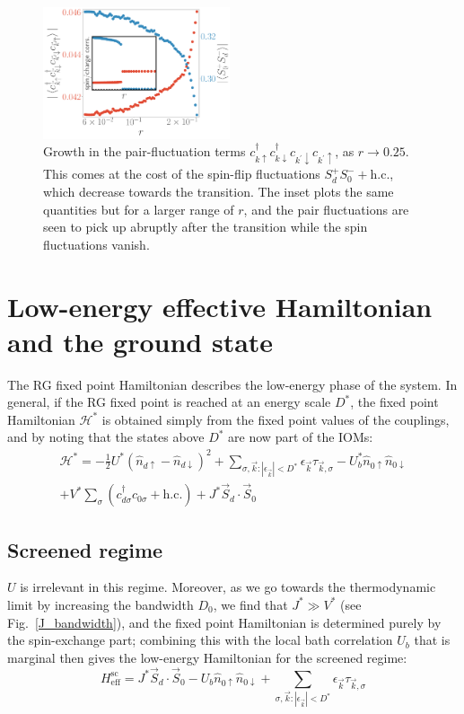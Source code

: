 \documentclass[reprint,superscriptaddress,floatfix]{revtex4-2}
\begin{document}
\begin{figure}[!htb]
	\centering
	\includegraphics[width=0.49\textwidth]{odlro.pdf}
	\caption{Growth in the pair-fluctuation terms \(c^\dagger_{k \uparrow}c^\dagger_{k \downarrow} c_{k^\prime \downarrow}c_{k^\prime \uparrow}\), as \(r \to 0.25\). This comes at the cost of the spin-flip fluctuations \(S_d^+ S_0^- + \text{h.c.}\), which decrease towards the transition. The inset plots the same quantities but for a larger range of \(r\), and the pair fluctuations are seen to pick up abruptly after the transition while the spin fluctuations vanish.}
	\label{pair_fluc}
\end{figure}

\section{Low-energy effective Hamiltonian and the ground state}
\label{eff-ham}

The RG fixed point Hamiltonian describes the low-energy phase of the system. In general, if the RG fixed point is reached at an energy scale \(D^*\), the fixed point Hamiltonian \(\mathcal{H}^*\) is obtained simply from the fixed point values of the couplings, and by noting that the states above \(D^*\) are now part of the IOMs:
\begin{equation}\begin{aligned}
	\mathcal{H}^* = -\frac{1}{2}U^*\left(\hat n_{d \uparrow} - \hat n_{d \downarrow}\right)^2 + \sum_{\sigma,\vec k:|\epsilon_{\vec k}| < D^*} \epsilon_{\vec k} \tau_{\vec k,\sigma} - U_b^* \hat n_{0 \uparrow} \hat n_{0 \downarrow} \\
	+ V^*\sum_\sigma \left( c^\dagger_{d\sigma}c_{0\sigma} + \text{h.c.}\right) + J^* \vec{S}_d\cdot\vec{S}_0
\end{aligned}\end{equation}

\subsection{Screened regime}
\(U\) is irrelevant in this regime. Moreover, as we go towards the thermodynamic limit by increasing the bandwidth \(D_0\), we find that \(J^* \gg V^*\) (see Fig.~\ref{J_bandwidth}), and the fixed point Hamiltonian is determined purely by the spin-exchange part; combining this with the local bath correlation \(U_b\) that is marginal then gives the low-energy Hamiltonian for the screened regime:
\begin{equation}
	H_\text{eff}^\text{sc} = J^* \vec{S}_d\cdot\vec{S}_0 - U_b \hat n_{0 \uparrow} \hat n_{0 \downarrow} + \sum_{\sigma,\vec k:|\epsilon_{\vec k}| < D^*} \epsilon_{\vec k} \tau_{\vec k,\sigma}
\end{equation}
\end{document}
